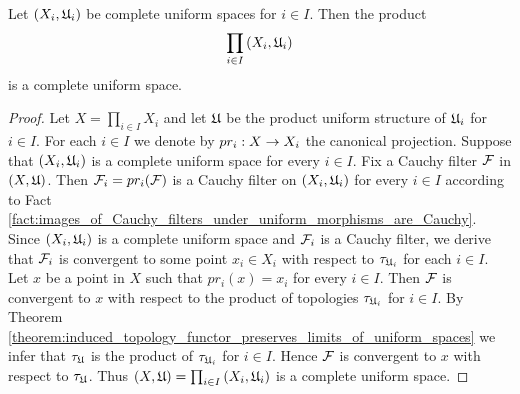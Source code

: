 \begin{theorem}\label{theorem:completeness_of_factors_imply_product_completeness}
Let $\left(X_i,{\mathfrak U}_i\right)$ be complete uniform spaces for $i \in I$. Then the product
$$\prod_{i\in I}\left(X_i,{\mathfrak U}_i\right)$$
is a complete uniform space.
\end{theorem}
\begin{proof}
Let $X = \prod_{i\in I}X_i$ and let ${\mathfrak U}$ be the product uniform structure of ${\mathfrak U}_i$ for $i\in I$. For each $i\in I$ we denote by $pr_i:X\rightarrow X_i$ the canonical projection. Suppose that $\left(X_i,{\mathfrak U}_i\right)$ is a complete uniform space for every $i\in I$. Fix a Cauchy filter ${\mathcal F}$ in $\left(X,{\mathfrak U}\right)$. Then ${\mathcal F}_i = pr_i({\mathcal F})$ is a Cauchy filter on $\left(X_i,{\mathfrak U}_i\right)$ for every $i\in I$ according to Fact \ref{fact:images_of_Cauchy_filters_under_uniform_morphisms_are_Cauchy}. Since $\left(X_i,{\mathfrak U}_i\right)$ is a complete uniform space and ${\mathcal F}_i$ is a Cauchy filter, we derive that ${\mathcal F}_i$ is convergent to some point $x_i \in X_i$ with respect to $\tau_{{\mathfrak U}_i}$ for each $i\in I$. Let $x$ be a point in $X$ such that $pr_i(x) = x_i$ for every $i \in I$. Then ${\mathcal F}$ is convergent to $x$ with respect to the product of topologies $\tau_{{\mathfrak U}_i}$ for $i\in I$. By Theorem \ref{theorem:induced_topology_functor_preserves_limits_of_uniform_spaces} we infer that $\tau_{{\mathfrak U}}$ is the product of $\tau_{{\mathfrak U}_i}$ for $i\in I$. Hence ${\mathcal F}$ is convergent to $x$ with respect to $\tau_{{\mathfrak U}}$. Thus $(X,{\mathfrak U}) = \prod_{i\in I}\left(X_i,{\mathfrak U}_i\right)$ is a complete uniform space.
\end{proof}

